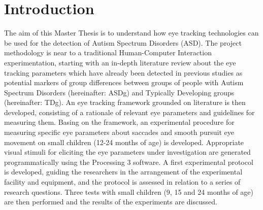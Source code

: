 \chapter{Introduction}
\label{chap:introduction}

The aim of this Master Thesis is to understand how eye tracking technologies can be used for the detection of Autism Spectrum Disorders (ASD). The project methodology is near to a traditional Human-Computer Interaction experimentation, starting with an in-depth literature review about the eye tracking parameters which have already been detected in previous studies as potential markers of group differences between groups of people with Autism Spectrum Disorders (hereinafter: ASDg) and Typically Developing groups (hereinafter: TDg). An eye tracking framework grounded on literature is then developed, consisting of a rationale of relevant eye parameters and guidelines for measuring them. Basing on the framework, an experimental procedure for measuring specific eye parameters about saccades and smooth pursuit eye movement on small children (12-24 months of age) is developed. Appropriate visual stimuli for eliciting the eye parameters under investigation are generated programmatically using the Processing 3 software. A first experimental protocol is developed, guiding the researchers in the arrangement of the experimental facility and equipment, and the protocol is assessed in relation to a series of research questions. Three tests with small children (9, 15 and 24 months of age) are then performed and the results of the experiments are discussed.\\

